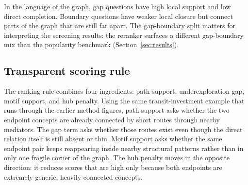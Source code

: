 \documentclass[11pt]{article}
\begin{document}
In the language of the graph, gap questions have high local support and low direct completion. Boundary questions have weaker local closure but connect parts of the graph that are still far apart. The gap-boundary split matters for interpreting the screening results: the reranker surfaces a different gap-boundary mix than the popularity benchmark (Section~\ref{sec:results}).

\subsection{Transparent scoring rule}

The ranking rule combines four ingredients: path support, underexploration gap, motif
support, and hub penalty. Using the same transit-investment example that runs through the
earlier method figures, path support asks whether the two endpoint concepts are already
connected by short routes through nearby mediators. The gap term asks whether those routes
exist even though the direct relation itself is still absent or thin. Motif support asks
whether the same endpoint pair keeps reappearing inside nearby structural patterns rather
than in only one fragile corner of the graph. The hub penalty moves in the opposite
direction: it reduces scores that are high only because both endpoints are extremely
generic, heavily connected concepts.
\end{document}
